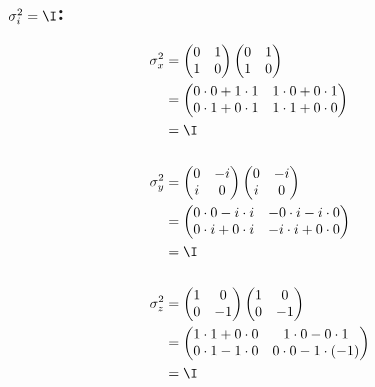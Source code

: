 \documentclass[ex]{exercise}
\begin{document}
\subsection{\(\sigma_i^2= \I\):}
\begin{align*}
    \sigma_x^2 &=\begin{pmatrix}
        0&1\\1&0
    \end{pmatrix}\begin{pmatrix}
        0&1\\1&0
    \end{pmatrix}\\
    &= \begin{pmatrix}
        0\cdot0+1\cdot1&1\cdot0+0\cdot1\\
        0\cdot1+0\cdot1&1\cdot1+0\cdot0
    \end{pmatrix}\\
    &= \I\\
    \\
    \sigma_y^2 &= \begin{pmatrix}
        0&-i\\i&0
    \end{pmatrix}\begin{pmatrix}
        0&-i\\i&0
    \end{pmatrix}\\
    &= \begin{pmatrix}
        0\cdot0 - i\cdot i&-0\cdot i - i\cdot0\\
        0\cdot i + 0\cdot i&-i\cdot i + 0\cdot0
    \end{pmatrix}\\
    &= \I\\
    \\
    \sigma_z^2 &= \begin{pmatrix}
        1&0\\0&-1
    \end{pmatrix}\begin{pmatrix}
        1&0\\0&-1
    \end{pmatrix}\\
    &= \begin{pmatrix}
        1\cdot1 + 0\cdot0&1\cdot0- 0\cdot1\\
        0\cdot1 - 1\cdot0&0\cdot0-1\cdot(-1)
    \end{pmatrix}\\
    &= \I
\end{align*}
\end{document}
